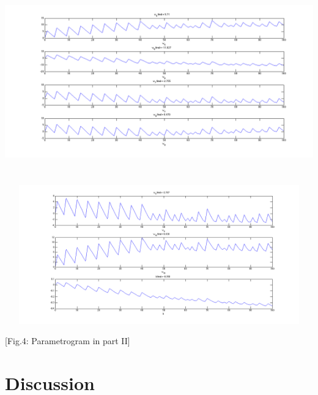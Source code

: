 \documentclass[12pt]{article}
\begin{document}
\vspace*{-2em}
\hspace*{-13em}
\includegraphics[width=26.5cm,height=8cm]{../res/part2_parametrogram2_init0.png}

\vspace*{-2em}
\hspace*{-13em}
\includegraphics[width=26.5cm,height=6cm]{../res/part2_parametrogram3_init0.png}

\vspace*{-2em}
\begin{center}
[Fig.4: Parametrogram in part II]
\end{center}

\section*{Discussion}
\vspace{-20pt}
\noindent\makebox[\linewidth]{\rule{\textwidth}{0.4pt}}
\end{document}
